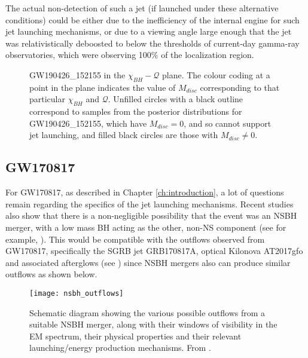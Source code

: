         The actual non-detection of such a jet (if launched under these alternative
        conditions) could be either due to the inefficiency of the internal engine for
        such jet launching mechanisms, or due to a viewing angle large
        enough that the jet was relativistically deboosted to below the thresholds of
        current-day gamma-ray observatories, which were observing 100\% of the
        localization region.

        \begin{figure}[H]
            \centering
            \def\svgwidth{\linewidth}
            
            \caption[GW190426 in the $\chi_{BH}-\mathcal{Q}$ plane]
            {
                GW190426\_152155 in the $\chi_{BH}-\mathcal{Q}$ plane. The colour coding
                at a point in the plane indicates the value of $M_{disc}$ corresponding
                to that particular $\chi_{BH}$ and $\mathcal{Q}$.  Unfilled circles with
                a black outline correspond to samples from the posterior distributions
                for GW190426\_152155, which have $M_{disc} = 0$, and so cannot support
                jet launching, and filled black circles are those with $M_{disc} \neq
                0$.
            }
            \label{fig:mdisc_q_190426}
        \end{figure}

    \subsection{GW170817}

        For GW170817, as described in Chapter \ref{ch:introduction}, a lot of questions
        remain regarding the specifics of the jet launching mechanisms. Recent studies
        also show that there is a non-negligible possibility that the event was an NSBH
        merger, with a low mass BH acting as the other, non-NS component (see for
        example, \cite{hinderer_2019}). This would be compatible with the outflows
        observed from GW170817, specifically the SGRB jet GRB170817A, optical Kilonova
        AT2017gfo and associated afterglows (see \cite{abbott_2017}) since NSBH mergers
        also can produce similar outflows as shown below.

        \begin{figure}[H]
            \centering
            \texttt{[image: nsbh\_outflows]}
            \caption[EM outflows from NSBH mergers, from \cite{barbieri_2019a}]
            {
                Schematic diagram showing the various possible outflows from a suitable
                NSBH merger, along with their windows of visibility in the EM spectrum,
                their physical properties and their relevant launching/energy production
                mechanisms. From \cite{barbieri_2019a}.
            }
            \label{fig:nsbh_outflows}
        \end{figure}

